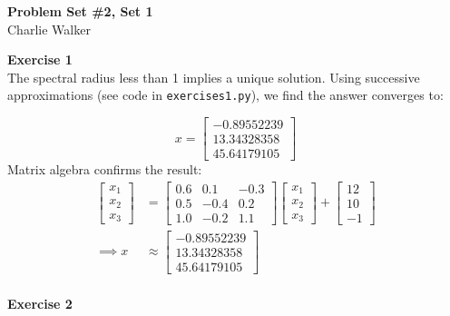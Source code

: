 \documentclass[letterpaper,12pt]{article}
\theoremstyle{definition}
\begin{document}
\begin{flushleft}
  \textbf{\large{Problem Set \#2, Set 1}} \\
  Charlie Walker
\end{flushleft}

\vspace{5mm}

\noindent\textbf{Exercise 1}\\

The spectral radius less than 1 implies a unique solution. Using successive approximations (see code in \texttt{exercises1.py}), we find the answer converges to:

\begin{equation*}
	x =\begin{bmatrix}
		-0.89552239\\
		13.34328358\\
		45.64179105
		\end{bmatrix}
\end{equation*}
Matrix algebra confirms the result:
\begin{equation*}
\begin{split}
\begin{bmatrix}
	x_1\\
	x_2\\
	x_3
\end{bmatrix}
&=\begin{bmatrix}
	0.6 & 0.1 & -0.3 \\
	0.5 & -0.4 & 0.2 \\
	1.0 & -0.2 & 1.1 
\end{bmatrix}
\begin{bmatrix}
	x_1\\
	x_2\\
	x_3
\end{bmatrix}
+\begin{bmatrix}
	12\\
	10\\
	-1
\end{bmatrix}\\
\implies x&\approx\begin{bmatrix}
		-0.89552239\\
		13.34328358\\
		45.64179105
\end{bmatrix}
\end{split}
\end{equation*}\\

\noindent\textbf{Exercise 2}\\
\end{document}
